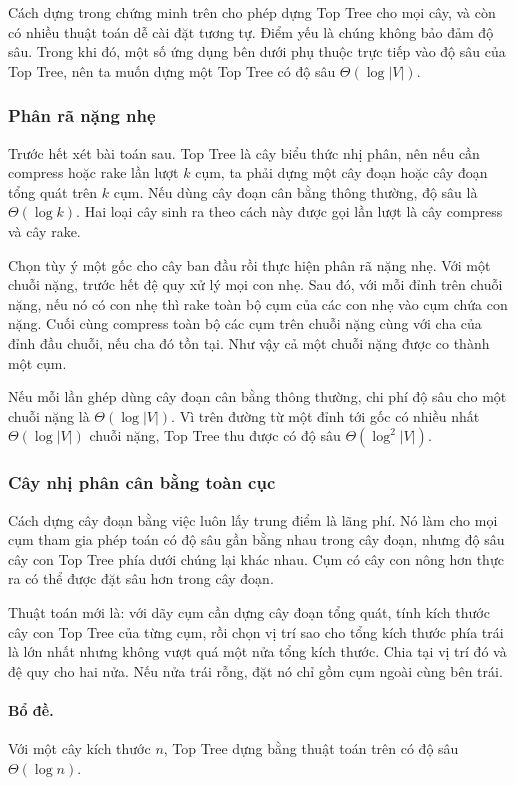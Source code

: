 \documentclass[11pt]{article}
\begin{document}
Cách dựng trong chứng minh trên cho phép dựng Top Tree cho mọi cây, và còn có
nhiều thuật toán dễ cài đặt tương tự. Điểm yếu là chúng không bảo đảm độ sâu.
Trong khi đó, một số ứng dụng bên dưới phụ thuộc trực tiếp vào độ sâu của Top
Tree, nên ta muốn dựng một Top Tree có độ sâu \(\Theta(\log |V|)\).

\subsubsection{Phân rã nặng nhẹ}

Trước hết xét bài toán sau. Top Tree là cây biểu thức nhị phân, nên nếu cần
compress hoặc rake lần lượt \(k\) cụm, ta phải dựng một cây đoạn hoặc cây đoạn
tổng quát trên \(k\) cụm. Nếu dùng cây đoạn cân bằng thông thường, độ sâu là
\(\Theta(\log k)\). Hai loại cây sinh ra theo cách này được gọi lần lượt là
cây compress và cây rake.

Chọn tùy ý một gốc cho cây ban đầu rồi thực hiện phân rã nặng nhẹ. Với một
chuỗi nặng, trước hết đệ quy xử lý mọi con nhẹ. Sau đó, với mỗi đỉnh trên chuỗi
nặng, nếu nó có con nhẹ thì rake toàn bộ cụm của các con nhẹ vào cụm chứa con
nặng. Cuối cùng compress toàn bộ các cụm trên chuỗi nặng cùng với cha của đỉnh
đầu chuỗi, nếu cha đó tồn tại. Như vậy cả một chuỗi nặng được co thành một
cụm.

Nếu mỗi lần ghép dùng cây đoạn cân bằng thông thường, chi phí độ sâu cho một
chuỗi nặng là \(\Theta(\log |V|)\). Vì trên đường từ một đỉnh tới gốc có nhiều
nhất \(\Theta(\log |V|)\) chuỗi nặng, Top Tree thu được có độ sâu
\(\Theta(\log^2 |V|)\).

\subsubsection{Cây nhị phân cân bằng toàn cục}

Cách dựng cây đoạn bằng việc luôn lấy trung điểm là lãng phí. Nó làm cho mọi
cụm tham gia phép toán có độ sâu gần bằng nhau trong cây đoạn, nhưng độ sâu
cây con Top Tree phía dưới chúng lại khác nhau. Cụm có cây con nông hơn thực
ra có thể được đặt sâu hơn trong cây đoạn.

Thuật toán mới là: với dãy cụm cần dựng cây đoạn tổng quát, tính kích thước cây
con Top Tree của từng cụm, rồi chọn vị trí sao cho tổng kích thước phía trái là
lớn nhất nhưng không vượt quá một nửa tổng kích thước. Chia tại vị trí đó và
đệ quy cho hai nửa. Nếu nửa trái rỗng, đặt nó chỉ gồm cụm ngoài cùng bên trái.

\paragraph{Bổ đề.}
Với một cây kích thước \(n\), Top Tree dựng bằng thuật toán trên có độ sâu
\(\Theta(\log n)\).
\end{document}
